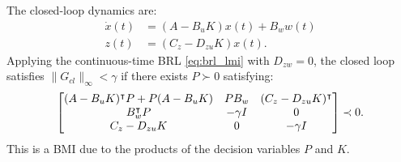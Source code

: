 The closed-loop dynamics are:
\begin{align}
    \dot{x}(t) &= (A - B_u K) x(t) + B_w w(t) \\
z(t) &= (C_z - D_{zu} K) x(t) .
\end{align}
Applying the continuous-time BRL \eqref{eq:brl_lmi} with $D_{zw} = 0$, the closed loop satisfies $\| G_{cl} \|_\infty < \gamma$ if there exists $P \succ 0$ satisfying:
\begin{equation}
    \begin{bmatrix} (A - B_u K)^\intercal P + P (A - B_u K) & P B_w & (C_z - D_{zu} K)^\intercal \\ B_w^\intercal P & -\gamma I & 0 \\ C_z - D_{zu} K & 0 & -\gamma I \end{bmatrix} \prec 0 . \label{eq:hinf_bmi}
\end{equation}
This is a BMI due to the products of the decision variables $P$ and $K$.

